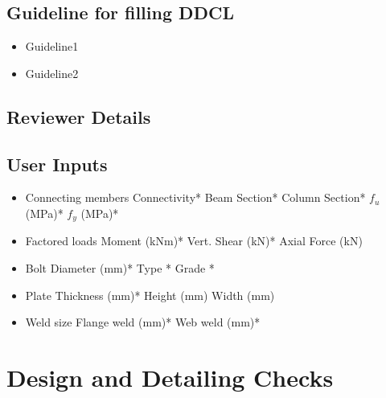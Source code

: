 \documentclass[11.5pt,a4paper,oneside]{report}
\begin{document}
\tableofcontents
\begin{Form}
\chapter*{Guideline for filling DDCL}
	\begin{itemize}
			\item    Guideline1
			\item    Guideline2
	\end{itemize}
\chapter*{Reviewer Details}

\chapter*{User Inputs}
%
\begin{itemize}
	\item Connecting members
		\subitem Connectivity*
		\subitem Beam Section*
		\subitem Column Section*
		\subitem $f_u$ (MPa)* 
		\subitem $f_y$ (MPa)* 
	\item Factored loads
		\subitem Moment (kNm)*
		\subitem Vert. Shear (kN)*
		\subitem Axial Force (kN)
	\item Bolt
		\subitem Diameter (mm)*
		\subitem Type *
		\subitem Grade *
	\item Plate
		\subitem Thickness (mm)*
		\subitem Height (mm)
		\subitem Width (mm)
	\item Weld size
		\subitem Flange weld (mm)*
		\subitem Web weld (mm)*
\end{itemize}
\part*{Design and Detailing Checks}

\end{Form}
\end{document}
